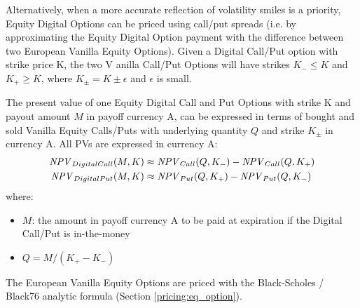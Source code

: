 Alternatively, when a more accurate reflection of volatility smiles is a priority, 
Equity Digital Options can be priced using call/put spreads (i.e. by approximating 
the Equity Digital Option payment with the difference between two European Vanilla 
Equity Options). Given a Digital Call/Put option with strike price K, the two V
anilla Call/Put Options will have strikes $K_- \leq K$ and $K_+\geq K$, where 
$K_\pm=K \pm\epsilon$ and $\epsilon$ is small.

The present value of one Equity Digital Call and Put Options with strike K and payout 
amount $M$ in payoff currency A, can be expressed in terms of bought and sold Vanilla 
Equity Calls/Puts with underlying quantity $Q$ and strike $K_\pm$ 
in currency A. All PVs are expressed in currency A:
\begin{align*}
\mathit{NPV}_{DigitalCall}(M,K) &\approx\mathit{NPV}_{Call}(Q,K_-) - \mathit{NPV}_{Call}(Q,K_+) \\
\mathit{NPV}_{DigitalPut}(M,K) &\approx\mathit{NPV}_{Put}(Q,K_+) - \mathit{NPV}_{Put}(Q,K_-) 
\end{align*}
where:
\begin{itemize}
\item $M$: the amount in payoff currency A to be paid at expiration if the Digital 
Call/Put is in-the-money
\item $Q = M/(K_+ - K_-)$
\end{itemize}

The European Vanilla Equity Options are priced with the Black-Scholes / Black76
analytic formula (Section \ref{pricing:eq_option}).
